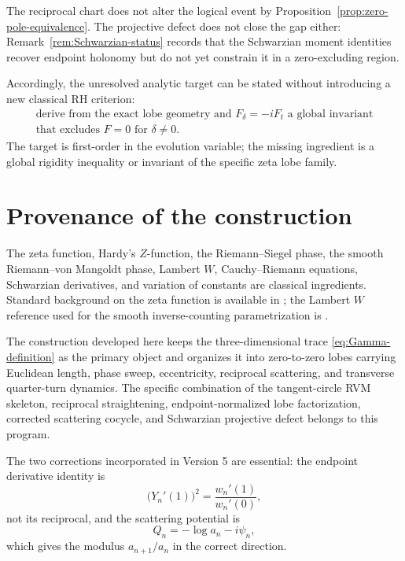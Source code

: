 \documentclass[11pt]{amsart}
\numberwithin{equation}{section}
\theoremstyle{definition}
\theoremstyle{remark}
\begin{document}
The reciprocal chart does not alter the logical event by Proposition~\ref{prop:zero-pole-equivalence}.  The projective defect does not close the gap either: Remark~\ref{rem:Schwarzian-status} records that the Schwarzian moment identities recover endpoint holonomy but do not yet constrain it in a zero-excluding region.

Accordingly, the unresolved analytic target can be stated without introducing a new classical RH criterion:
\begin{multline}
\text{derive from the exact lobe geometry and }F_\delta=-iF_t\text{ a global invariant}\\
\text{that excludes }F=0\text{ for }\delta\neq0.
\label{eq:open-target}
\end{multline}
The target is first-order in the evolution variable; the missing ingredient is a global rigidity inequality or invariant of the specific zeta lobe family.

\section{Provenance of the construction}
\label{sec:provenance}

The zeta function, Hardy's $Z$-function, the Riemann--Siegel phase, the smooth Riemann--von Mangoldt phase, Lambert $W$, Cauchy--Riemann equations, Schwarzian derivatives, and variation of constants are classical ingredients.  Standard background on the zeta function is available in \cite{Titchmarsh1986,Edwards2001}; the Lambert $W$ reference used for the smooth inverse-counting parametrization is \cite{CorlessEtAl1996}.

The construction developed here keeps the three-dimensional trace \eqref{eq:Gamma-definition} as the primary object and organizes it into zero-to-zero lobes carrying Euclidean length, phase sweep, eccentricity, reciprocal scattering, and transverse quarter-turn dynamics.  The specific combination of the tangent-circle RVM skeleton, reciprocal straightening, endpoint-normalized lobe factorization, corrected scattering cocycle, and Schwarzian projective defect belongs to this program.

The two corrections incorporated in Version 5 are essential: the endpoint derivative identity is
\begin{equation}
\bigl(Y_n'(1)\bigr)^2=\frac{w_n'(1)}{w_n'(0)},
\label{eq:provenance-endpoint-correction}
\end{equation}
not its reciprocal, and the scattering potential is
\begin{equation}
Q_n=-\log a_n-i\psi_n,
\label{eq:provenance-Q-correction}
\end{equation}
which gives the modulus $a_{n+1}/a_n$ in the correct direction.
\end{document}
